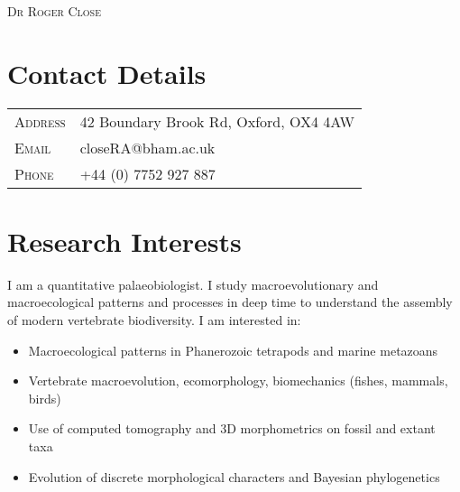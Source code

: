 \documentclass[a4paper, oneside, final]{scrartcl} %
\newcommand{\gray}{\rowcolor[gray]{1}} %
\begin{document}
\begin{center} %


{\fontsize{36}{36}\selectfont\scshape Dr Roger Close} %

\vspace{1cm} %

\section{Contact Details}
\begin{tabularx}{0.97\linewidth}{>{\raggedleft\scshape}p{2cm}X}
\gray Address & 42 Boundary Brook Rd, Oxford, OX4 4AW\\
\gray Email & closeRA@bham.ac.uk\\
\gray Phone & +44 (0) 7752 927 887\\
\end{tabularx}
\vspace{6pt}

\section{Research Interests}
\begin{flushleft}
I am a quantitative palaeobiologist. I study macroevolutionary and macroecological patterns and processes in deep time to understand the assembly of modern vertebrate biodiversity. I am interested in:

\begin{itemize}
\itemsep-0.5em
  \item Macroecological patterns in Phanerozoic tetrapods and marine metazoans
  \item Vertebrate macroevolution, ecomorphology, biomechanics (fishes, mammals, birds)
  \item Use of computed tomography and 3D morphometrics on fossil and extant taxa
  \item Evolution of discrete morphological characters and Bayesian phylogenetics
\end{itemize}


\end{flushleft}
\end{center}
\end{document}

